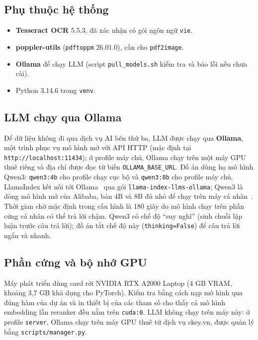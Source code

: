 \subsection{Phụ thuộc hệ thống}

\begin{itemize}
  \item \textbf{Tesseract OCR} 5.5.3, đã xác nhận có gói ngôn ngữ \texttt{vie}.
  \item \textbf{poppler-utils} (\texttt{pdftoppm} 26.01.0), cần cho \texttt{pdf2image}.
  \item \textbf{Ollama} để chạy LLM (script \texttt{pull\_models.sh} kiểm tra và báo lỗi nếu chưa cài).
  \item Python 3.14.6 trong \texttt{venv}.
\end{itemize}

\subsection{LLM chạy qua Ollama}

Để dữ liệu không đi qua dịch vụ AI bên thứ ba, LLM được chạy qua \textbf{Ollama}, một trình phục vụ mô hình mở với API HTTP (mặc định tại \texttt{http://localhost:11434}); ở profile máy chủ, Ollama chạy trên một máy GPU thuê riêng và địa chỉ được đọc từ biến \texttt{OLLAMA\_BASE\_URL}. Đồ án dùng họ mô hình Qwen3: \texttt{qwen3:4b} cho profile chạy cục bộ và \texttt{qwen3:8b} cho profile máy chủ. LlamaIndex kết nối tới Ollama~\cite{ollama} qua gói \texttt{llama-index-llms-ollama}; Qwen3 là dòng mô hình mở của Alibaba, bản 4B và 8B đủ nhỏ để chạy trên máy cá nhân~\cite{qwen3}. Thời gian chờ mặc định trong cấu hình là 180 giây do mô hình chạy trên phần cứng cá nhân có thể trả lời chậm. Qwen3 có chế độ ``suy nghĩ'' (sinh chuỗi lập luận trước câu trả lời); đồ án tắt chế độ này (\texttt{thinking=False}) để câu trả lời ngắn và nhanh.


\subsection{Phần cứng và bộ nhớ GPU}
\label{sec:phan-cung}

Máy phát triển dùng card rời NVIDIA RTX A2000 Laptop (4 GB VRAM, khoảng 3{,}7 GB khả dụng cho PyTorch). Kiểm tra bằng cách nạp mô hình qua đúng hàm của dự án và in thiết bị của các tham số cho thấy cả mô hình embedding lẫn reranker đều nằm trên \texttt{cuda:0}. LLM không chạy trên máy này: ở profile \texttt{server}, Ollama chạy trên máy GPU thuê từ dịch vụ ckey.vn, được quản lý bằng \texttt{scripts/manager.py}.

